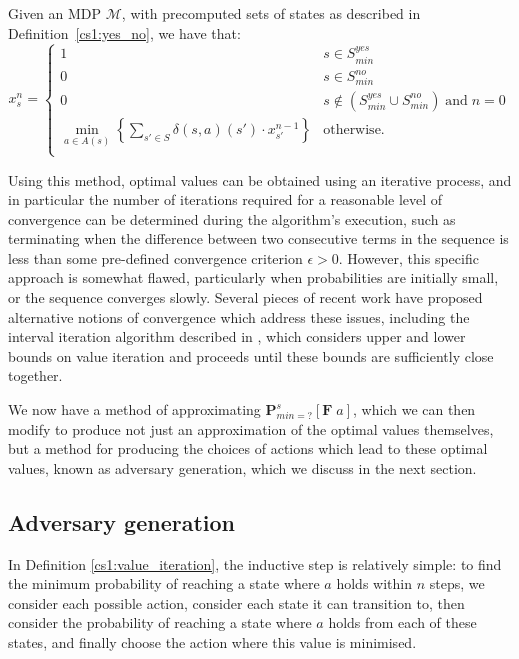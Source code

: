 \begin{definition}
\label{cs1:value_iteration}

Given an MDP $\mathcal{M}$, with precomputed sets of states as described in Definition~\ref{cs1:yes_no}, we have that:
\begin{equation*}
x^n_s = \begin{cases}
        1 & s \in S^{yes}_{min} \\
        0 & s \in S^{no}_{min} \\
        0 & s \notin (S^{yes}_{min} \cup S^{no}_{min}) \; \text{and} \; n=0 \\
        \min_{a \in A(s)} \left\{ \sum_{s' \in S}\delta(s,a)(s') \cdot x^{n-1}_{s'} \right\} & \text{otherwise.} \\
    \end{cases}
\end{equation*}
\end{definition}
Using this method, optimal values can be obtained using an iterative process, and in particular the number of iterations required for a reasonable level of convergence can be determined during the algorithm's execution, such as terminating when the difference between two consecutive terms in the sequence is less than some pre-defined convergence criterion $\epsilon>0$. However, this specific approach is somewhat flawed, particularly when probabilities are initially small, or the sequence converges slowly. Several pieces of recent work have proposed alternative notions of convergence which address these issues, including the interval iteration algorithm described in \cite{haddad_interval_2018}, which considers upper and lower bounds on value iteration and proceeds until these bounds are sufficiently close together.

We now have a method of approximating $\mathbf{P}^{s}_{min =?} [\mathbf{F} \; a]$, which we can then modify to produce not just an approximation of the optimal values themselves, but a method for producing the choices of actions which lead to these optimal values, known as adversary generation, which we discuss in the next section.

\subsection{Adversary generation}
\label{cs1:adversary_gen}

In Definition \ref{cs1:value_iteration}, the inductive step is relatively simple: to find the minimum probability of reaching a state where $a$ holds within $n$ steps, we consider each possible action, consider each state it can transition to, then consider the probability of reaching a state where $a$ holds from each of these states, and finally choose the action where this value is minimised.

